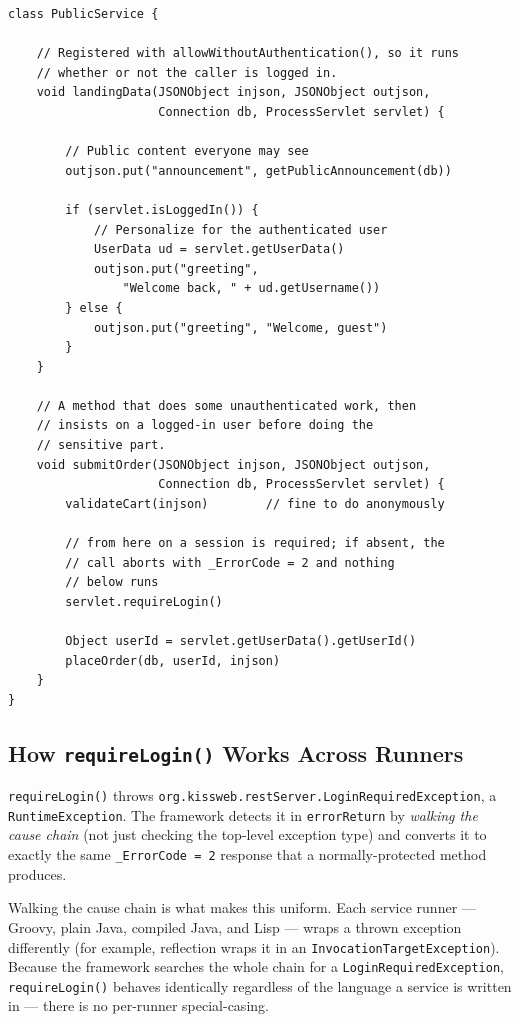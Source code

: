\begin{lstlisting}[style=groovy]
class PublicService {

    // Registered with allowWithoutAuthentication(), so it runs
    // whether or not the caller is logged in.
    void landingData(JSONObject injson, JSONObject outjson,
                     Connection db, ProcessServlet servlet) {

        // Public content everyone may see
        outjson.put("announcement", getPublicAnnouncement(db))

        if (servlet.isLoggedIn()) {
            // Personalize for the authenticated user
            UserData ud = servlet.getUserData()
            outjson.put("greeting",
                "Welcome back, " + ud.getUsername())
        } else {
            outjson.put("greeting", "Welcome, guest")
        }
    }

    // A method that does some unauthenticated work, then
    // insists on a logged-in user before doing the
    // sensitive part.
    void submitOrder(JSONObject injson, JSONObject outjson,
                     Connection db, ProcessServlet servlet) {
        validateCart(injson)        // fine to do anonymously

        // from here on a session is required; if absent, the
        // call aborts with _ErrorCode = 2 and nothing
        // below runs
        servlet.requireLogin()

        Object userId = servlet.getUserData().getUserId()
        placeOrder(db, userId, injson)
    }
}
\end{lstlisting}

\subsection{How \texttt{requireLogin()} Works Across Runners}

\texttt{requireLogin()} throws \texttt{org.\allowbreak{}kissweb.\allowbreak{}restServer.\allowbreak{}LoginRequiredException}, a \texttt{RuntimeException}.  The framework detects it in \texttt{errorReturn} by \emph{walking the cause chain} (not just checking the top-level exception type) and converts it to exactly the same \texttt{\_ErrorCode = 2} response that a normally-protected method produces.

\begin{notebox}
Walking the cause chain is what makes this uniform.  Each service runner --- Groovy, plain Java, compiled Java, and Lisp --- wraps a thrown exception differently (for example, reflection wraps it in an \texttt{InvocationTargetException}).  Because the framework searches the whole chain for a \texttt{LoginRequiredException}, \texttt{requireLogin()} behaves identically regardless of the language a service is written in --- there is no per-runner special-casing.
\end{notebox}

